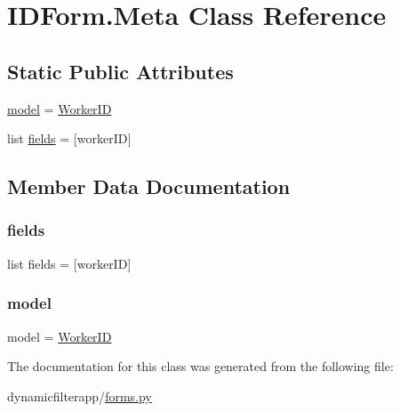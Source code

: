 \hypertarget{classdynamicfilterapp_1_1forms_1_1_i_d_form_1_1_meta}{}\section{I\+D\+Form.\+Meta Class Reference}
\label{classdynamicfilterapp_1_1forms_1_1_i_d_form_1_1_meta}
\subsection*{Static Public Attributes}
\begin{DoxyCompactItemize}
\item 
\mbox{\hyperlink{classdynamicfilterapp_1_1forms_1_1_i_d_form_1_1_meta_a508cc3106d2c29fe07dc87cbe3ea6927}{model}} = \mbox{\hyperlink{classdynamicfilterapp_1_1models_1_1_worker_i_d}{Worker\+ID}}
\item 
list \mbox{\hyperlink{classdynamicfilterapp_1_1forms_1_1_i_d_form_1_1_meta_a95a6920fe0e5c16303574629629ce2c1}{fields}} = \mbox{[}\textquotesingle{}worker\+ID\textquotesingle{}\mbox{]}
\end{DoxyCompactItemize}


\subsection{Member Data Documentation}
\mbox{\label{classdynamicfilterapp_1_1forms_1_1_i_d_form_1_1_meta_a95a6920fe0e5c16303574629629ce2c1}} 
\subsubsection{\texorpdfstring{fields}{fields}}
{\footnotesize\ttfamily list fields = \mbox{[}\textquotesingle{}worker\+ID\textquotesingle{}\mbox{]}\hspace{0.3cm}{\ttfamily [static]}}

\mbox{\label{classdynamicfilterapp_1_1forms_1_1_i_d_form_1_1_meta_a508cc3106d2c29fe07dc87cbe3ea6927}} 
\subsubsection{\texorpdfstring{model}{model}}
{\footnotesize\ttfamily model = \mbox{\hyperlink{classdynamicfilterapp_1_1models_1_1_worker_i_d}{Worker\+ID}}\hspace{0.3cm}{\ttfamily [static]}}



The documentation for this class was generated from the following file\+:\begin{DoxyCompactItemize}
\item 
dynamicfilterapp/\mbox{\hyperlink{forms_8py}{forms.\+py}}\end{DoxyCompactItemize}
